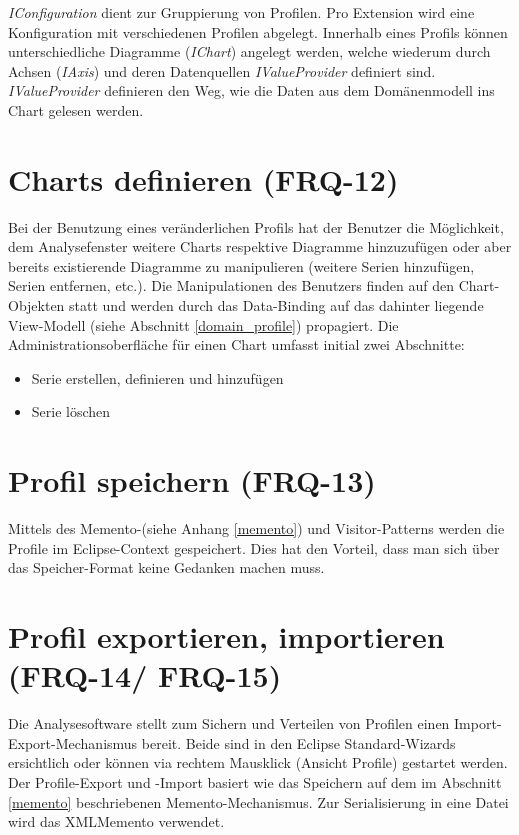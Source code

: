 \textit{IConfiguration} dient zur Gruppierung von Profilen. Pro Extension wird eine Konfiguration mit verschiedenen Profilen abgelegt. Innerhalb eines Profils können unterschiedliche Diagramme (\textit{IChart}) angelegt werden, welche wiederum durch Achsen (\textit{IAxis}) und deren Datenquellen \textit{IValueProvider} definiert sind. \textit{IValueProvider} definieren den Weg, wie die Daten aus dem Domänenmodell ins Chart gelesen werden.

\section{Charts definieren (FRQ-12)}
Bei der Benutzung eines veränderlichen Profils hat der Benutzer die Möglichkeit, dem Analysefenster weitere Charts respektive Diagramme hinzuzufügen oder aber bereits existierende Diagramme zu manipulieren (weitere Serien hinzufügen, Serien entfernen, etc.). Die Manipulationen des Benutzers finden auf den Chart-Objekten statt und werden durch das Data-Binding auf das dahinter liegende View-Modell (siehe Abschnitt \ref{domain_profile}) propagiert. Die Administrationsoberfläche für einen Chart umfasst initial zwei Abschnitte:
\begin{itemize}
	\item Serie erstellen, definieren und hinzufügen
	 \item Serie löschen
\end{itemize}

\section{Profil speichern (FRQ-13)}
Mittels des Memento-(siehe Anhang \ref{memento}) und Visitor-Patterns\cite[S. 331]{gamma1995design} werden die Profile im Eclipse-Context gespeichert. Dies hat den Vorteil, dass man sich über das Speicher-Format keine Gedanken machen muss.

\section{Profil exportieren, importieren (FRQ-14/ FRQ-15)}
Die Analysesoftware stellt zum Sichern und Verteilen von Profilen einen Import-Export-Mechanismus bereit. Beide sind in den Eclipse Standard-Wizards ersichtlich oder können via rechtem Mausklick (Ansicht Profile) gestartet werden. Der Profile-Export und -Import basiert wie das Speichern auf dem im Abschnitt \ref{memento} beschriebenen Memento-Mechanismus. Zur Serialisierung in eine Datei wird das XMLMemento verwendet. 

